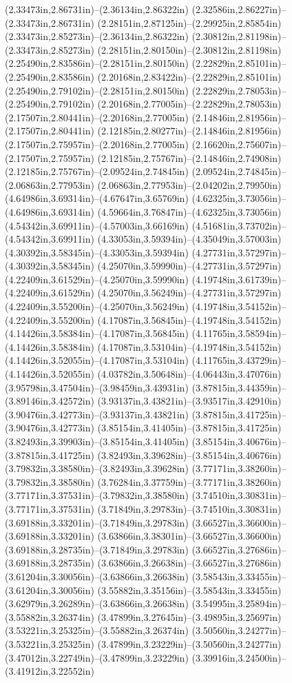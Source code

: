 (2.33473in,2.86731in)--(2.36134in,2.86322in) (2.32586in,2.86227in)--(2.33473in,2.86731in) (2.28151in,2.87125in)--(2.29925in,2.85854in) (2.33473in,2.85273in)--(2.36134in,2.86322in) (2.30812in,2.81198in)--(2.33473in,2.85273in) (2.28151in,2.80150in)--(2.30812in,2.81198in) (2.25490in,2.83586in)--(2.28151in,2.80150in) (2.22829in,2.85101in)--(2.25490in,2.83586in) (2.20168in,2.83422in)--(2.22829in,2.85101in) (2.25490in,2.79102in)--(2.28151in,2.80150in) (2.22829in,2.78053in)--(2.25490in,2.79102in) (2.20168in,2.77005in)--(2.22829in,2.78053in) (2.17507in,2.80441in)--(2.20168in,2.77005in) (2.14846in,2.81956in)--(2.17507in,2.80441in) (2.12185in,2.80277in)--(2.14846in,2.81956in) (2.17507in,2.75957in)--(2.20168in,2.77005in) (2.16620in,2.75607in)--(2.17507in,2.75957in) (2.12185in,2.75767in)--(2.14846in,2.74908in) (2.12185in,2.75767in)--(2.09524in,2.74845in) (2.09524in,2.74845in)--(2.06863in,2.77953in) (2.06863in,2.77953in)--(2.04202in,2.79950in) (4.64986in,3.69314in)--(4.67647in,3.65769in) (4.62325in,3.73056in)--(4.64986in,3.69314in) (4.59664in,3.76847in)--(4.62325in,3.73056in) (4.54342in,3.69911in)--(4.57003in,3.66169in) (4.51681in,3.73702in)--(4.54342in,3.69911in) (4.33053in,3.59394in)--(4.35049in,3.57003in) (4.30392in,3.58345in)--(4.33053in,3.59394in) (4.27731in,3.57297in)--(4.30392in,3.58345in) (4.25070in,3.59990in)--(4.27731in,3.57297in) (4.22409in,3.61529in)--(4.25070in,3.59990in) (4.19748in,3.61739in)--(4.22409in,3.61529in) (4.25070in,3.56249in)--(4.27731in,3.57297in) (4.22409in,3.55200in)--(4.25070in,3.56249in) (4.19748in,3.54152in)--(4.22409in,3.55200in) (4.17087in,3.56845in)--(4.19748in,3.54152in) (4.14426in,3.58384in)--(4.17087in,3.56845in) (4.11765in,3.58594in)--(4.14426in,3.58384in) (4.17087in,3.53104in)--(4.19748in,3.54152in) (4.14426in,3.52055in)--(4.17087in,3.53104in) (4.11765in,3.43729in)--(4.14426in,3.52055in) (4.03782in,3.50648in)--(4.06443in,3.47076in) (3.95798in,3.47504in)--(3.98459in,3.43931in) (3.87815in,3.44359in)--(3.89146in,3.42572in) (3.93137in,3.43821in)--(3.93517in,3.42910in) (3.90476in,3.42773in)--(3.93137in,3.43821in) (3.87815in,3.41725in)--(3.90476in,3.42773in) (3.85154in,3.41405in)--(3.87815in,3.41725in) (3.82493in,3.39903in)--(3.85154in,3.41405in) (3.85154in,3.40676in)--(3.87815in,3.41725in) (3.82493in,3.39628in)--(3.85154in,3.40676in) (3.79832in,3.38580in)--(3.82493in,3.39628in) (3.77171in,3.38260in)--(3.79832in,3.38580in) (3.76284in,3.37759in)--(3.77171in,3.38260in) (3.77171in,3.37531in)--(3.79832in,3.38580in) (3.74510in,3.30831in)--(3.77171in,3.37531in) (3.71849in,3.29783in)--(3.74510in,3.30831in) (3.69188in,3.33201in)--(3.71849in,3.29783in) (3.66527in,3.36600in)--(3.69188in,3.33201in) (3.63866in,3.38301in)--(3.66527in,3.36600in) (3.69188in,3.28735in)--(3.71849in,3.29783in) (3.66527in,3.27686in)--(3.69188in,3.28735in) (3.63866in,3.26638in)--(3.66527in,3.27686in) (3.61204in,3.30056in)--(3.63866in,3.26638in) (3.58543in,3.33455in)--(3.61204in,3.30056in) (3.55882in,3.35156in)--(3.58543in,3.33455in) (3.62979in,3.26289in)--(3.63866in,3.26638in) (3.54995in,3.25894in)--(3.55882in,3.26374in) (3.47899in,3.27645in)--(3.49895in,3.25697in) (3.53221in,3.25325in)--(3.55882in,3.26374in) (3.50560in,3.24277in)--(3.53221in,3.25325in) (3.47899in,3.23229in)--(3.50560in,3.24277in) (3.47012in,3.22749in)--(3.47899in,3.23229in) (3.39916in,3.24500in)--(3.41912in,3.22552in) 